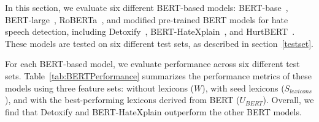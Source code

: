 In this section, we evaluate six different BERT-based models: BERT-base~\cite{devlin2018bert}, BERT-large~\cite{devlin2018bert}, RoBERTa~\cite{liu2019roberta}, and modified pre-trained BERT models for hate speech detection, including Detoxify~\cite{Detoxify}, BERT-HateXplain~\cite{Mathew_Saha_Yimam_Biemann_Goyal_Mukherjee_2021}, and HurtBERT~\cite{hurtbert2020}. These models are tested on six different test sets, as described in section~\ref{testset}.

For each BERT-based model, we evaluate performance across six different test sets. Table~\ref{tab:BERTPerformance} summarizes the performance metrics of these models using three feature sets: without lexicons ($W$), with seed lexicons ($S_{lexicons}$), and with the best-performing lexicons derived from BERT ($U_{BERT}$). Overall, we find that Detoxify and BERT-HateXplain outperform the other BERT models.

